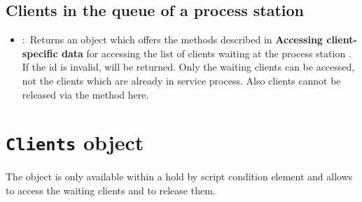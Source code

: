 \section{Clients in the queue of a process station}

\begin{itemize}

  \item
  :\
  Returns an object which offers the methods described in \textbf{Accessing client-specific data}
  for accessing the list of clients waiting at the process station \cm{id}. If the id is invalid, 
  will be returned. Only the waiting clients can be accessed, not the clients which are already in service process.
  Also clients cannot be released via the \cm{release} method here.
  
\end{itemize}



\chapter{\texttt{Clients} object}

The  object is only available within a hold by script condition element
and allows to access the waiting clients and to release them.

